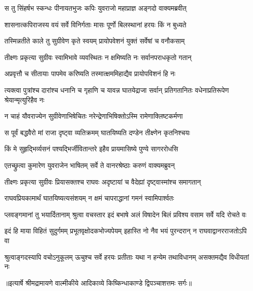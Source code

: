 \twolineshloka
{स तु सिंहर्षभ स्कन्धः पीनायतभुजः कपिः}
{युवराजो महाप्राज्ञ अङ्गदो वाक्यमब्रवीत्} %

\twolineshloka
{शासनात्कपिराजस्य वयं सर्वे विनिर्गताः}
{मासः पूर्णो बिलस्थानां हरयः किं न बुध्यते} %

\twolineshloka
{तस्मिन्नतीते काले तु सुग्रीवेण कृते स्वयम्}
{प्रायोपवेशनं युक्तं सर्वेषां च वनौकसाम्} %

\twolineshloka
{तीक्ष्णः प्रकृत्या सुग्रीवः स्वामिभावे व्यवस्थितः}
{न क्षमिष्यति नः सर्वानपराधकृतो गतान्} %

\twolineshloka
{अप्रवृत्तौ च सीतायाः पापमेव करिष्यति}
{तस्मात्क्षममिहाद्यैव प्रायोपविशनं हि नः} %

\threelineshloka
{त्यक्त्वा पुत्रांश्च दारांश्च धनानि च गृहाणि च}
{यावन्न घातयेद्राजा सर्वान् प्रतिगतानितः}
{वधेनाप्रतिरूपेण श्रेयान्मृत्युरिहैव नः} %

\twolineshloka
{न चाहं यौवराज्येन सुग्रीवेणाभिषेचितः}
{नरेन्द्रेणाभिषिक्तोऽस्मि रामेणाक्लिष्टकर्मणा} %

\twolineshloka
{स पूर्वं बद्धवैरो मां राजा दृष्ट्वा व्यतिक्रमम्}
{घातयिष्यति दण्डेन तीक्ष्णेन कृतनिश्चयः} %

\twolineshloka
{किं मे सुहृद्भिर्व्यसनं पश्यद्भिर्जीवितान्तरे}
{इहैव प्रायमासिष्ये पुण्ये सागररोधसि} %

\twolineshloka
{एतच्छ्रुत्वा कुमारेण युवराजेन भाषितम्}
{सर्वे ते वानरश्रेष्ठाः करुणं वाक्यमब्रुवन्} %

\twolineshloka
{तीक्ष्णः प्रकृत्या सुग्रीवः प्रियासक्तश्च राघवः}
{अदृष्टायां च वैदेह्यां दृष्ट्वास्मांश्च समागतान्} %

\twolineshloka
{राघवप्रियकामार्थं घातयिष्यत्यसंशयम्}
{न क्षमं चापराद्धानां गमनं स्वामिपार्श्वतः} %

\fourlineindentedshloka
{प्लवङ्गमानां तु भयार्दितानाम्}
{श्रुत्वा वचस्तार इदं बभाषे}
{अलं विषादेन बिलं प्रविश्य}
{वसाम सर्वे यदि रोचते वः} %

\fourlineindentedshloka
{इदं हि माया विहितं सुदुर्गमम्}
{प्रभूतवृक्षोदकभोज्यपेयम्}
{इहास्ति नो नैव भयं पुरन्दरान्}
{न राघवाद्वानरराजतोऽपि वा} %

\fourlineindentedshloka
{श्रुत्वाङ्गदस्यापि वचोऽनुकूलम्}
{ऊचुश्च सर्वे हरयः प्रतीताः}
{यथा न हन्येम तथाविधानम्}
{असक्तमद्यैव विधीयतां नः} %


{॥इत्यार्षे श्रीमद्रामायणे वाल्मीकीये आदिकाव्ये किष्किन्धाकाण्डे द्विपञ्चाशत्तमः सर्गः॥}

